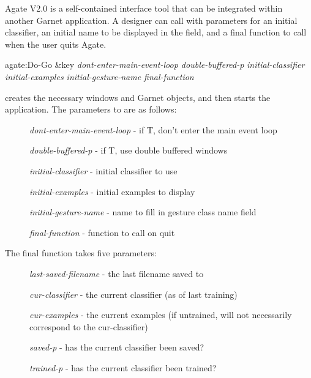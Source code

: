 Agate V2.0 is a self-contained interface tool that can be integrated within
another Garnet application.  A designer can call  with
parameters for an initial classifier, an initial name to be
displayed in the  field, and a final function
to call when the user quits Agate.

\begin{programexample}
agate:Do-Go \&key {\it dont-enter-main-event-loop  double-buffered-p}\value{function}
                 {\it initial-classifier  initial-examples  initial-gesture-name final-function}
\end{programexample}

 creates the necessary windows and Garnet objects, and
then starts the application.  The parameters to  are as follows:

\begin{description}
\item[] {\it dont-enter-main-event-loop} - if T, don't enter the main event loop

\item[] {\it double-buffered-p} - if T, use double buffered windows

\item[] {\it initial-classifier} - initial classifier to use

\item[] {\it initial-examples} - initial examples to display

\item[] {\it initial-gesture-name} - name to fill in gesture class name field

\item[] {\it final-function} - function to call on quit
\end{description}

The final function takes five parameters:

\begin{description}
\item[] {\it last-saved-filename} - the last filename saved to

\item[] {\it cur-classifier} - the current classifier (as of last training)

\item[] {\it cur-examples} - the current examples (if untrained, will not
necessarily correspond to the cur-classifier)

\item[] {\it saved-p} - has the current classifier been saved?

\item[] {\it trained-p} - has the current classifier been trained?
\end{description}


